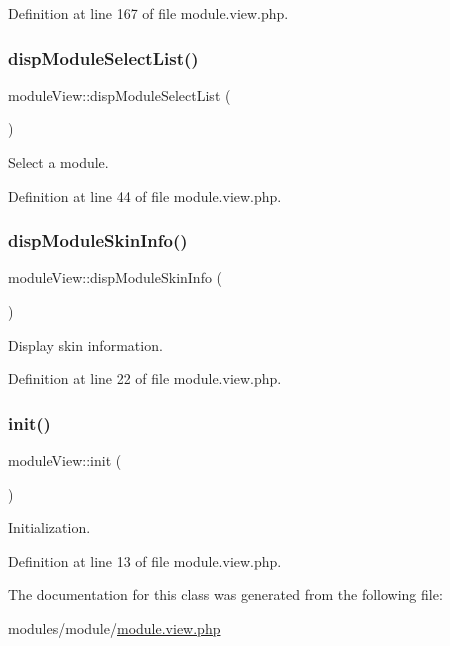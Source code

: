 Definition at line 167 of file module.\+view.\+php.

\hypertarget{classmoduleView_a801c0978511c936589b76fb609a2778a}{}\label{classmoduleView_a801c0978511c936589b76fb609a2778a} 
\subsubsection{\texorpdfstring{disp\+Module\+Select\+List()}{dispModuleSelectList()}}
{\footnotesize\ttfamily module\+View\+::disp\+Module\+Select\+List (\begin{DoxyParamCaption}{ }\end{DoxyParamCaption})}



Select a module. 



Definition at line 44 of file module.\+view.\+php.

\hypertarget{classmoduleView_abe0e2fe2a54a48a08c0a208b075b5586}{}\label{classmoduleView_abe0e2fe2a54a48a08c0a208b075b5586} 
\subsubsection{\texorpdfstring{disp\+Module\+Skin\+Info()}{dispModuleSkinInfo()}}
{\footnotesize\ttfamily module\+View\+::disp\+Module\+Skin\+Info (\begin{DoxyParamCaption}{ }\end{DoxyParamCaption})}



Display skin information. 



Definition at line 22 of file module.\+view.\+php.

\hypertarget{classmoduleView_a1d511f9c31e82b1d66703287c3834dc0}{}\label{classmoduleView_a1d511f9c31e82b1d66703287c3834dc0} 
\subsubsection{\texorpdfstring{init()}{init()}}
{\footnotesize\ttfamily module\+View\+::init (\begin{DoxyParamCaption}{ }\end{DoxyParamCaption})}



Initialization. 



Definition at line 13 of file module.\+view.\+php.



The documentation for this class was generated from the following file\+:\begin{DoxyCompactItemize}
\item 
modules/module/\hyperlink{module_8view_8php}{module.\+view.\+php}\end{DoxyCompactItemize}
